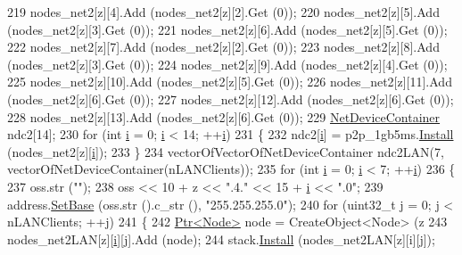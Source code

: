 \begin{DoxyCode}
219       nodes\_net2[z][4].Add (nodes\_net2[z][2].Get (0));
220       nodes\_net2[z][5].Add (nodes\_net2[z][3].Get (0));
221       nodes\_net2[z][6].Add (nodes\_net2[z][5].Get (0));
222       nodes\_net2[z][7].Add (nodes\_net2[z][2].Get (0));
223       nodes\_net2[z][8].Add (nodes\_net2[z][3].Get (0));
224       nodes\_net2[z][9].Add (nodes\_net2[z][4].Get (0));
225       nodes\_net2[z][10].Add (nodes\_net2[z][5].Get (0));
226       nodes\_net2[z][11].Add (nodes\_net2[z][6].Get (0));
227       nodes\_net2[z][12].Add (nodes\_net2[z][6].Get (0));
228       nodes\_net2[z][13].Add (nodes\_net2[z][6].Get (0));
229       \hyperlink{classns3_1_1NetDeviceContainer}{NetDeviceContainer} ndc2[14];
230       \textcolor{keywordflow}{for} (\textcolor{keywordtype}{int} \hyperlink{bernuolliDistribution_8m_a6f6ccfcf58b31cb6412107d9d5281426}{i} = 0; \hyperlink{bernuolliDistribution_8m_a6f6ccfcf58b31cb6412107d9d5281426}{i} < 14; ++\hyperlink{bernuolliDistribution_8m_a6f6ccfcf58b31cb6412107d9d5281426}{i})
231         \{
232           ndc2[\hyperlink{bernuolliDistribution_8m_a6f6ccfcf58b31cb6412107d9d5281426}{i}] = p2p\_1gb5ms.\hyperlink{classns3_1_1PointToPointHelper_ab9162fea3e88722666fed1106df1f9ec}{Install} (nodes\_net2[z][\hyperlink{bernuolliDistribution_8m_a6f6ccfcf58b31cb6412107d9d5281426}{i}]);
233         \}
234       vectorOfVectorOfNetDeviceContainer ndc2LAN(7, vectorOfNetDeviceContainer(nLANClients));
235       \textcolor{keywordflow}{for} (\textcolor{keywordtype}{int} \hyperlink{bernuolliDistribution_8m_a6f6ccfcf58b31cb6412107d9d5281426}{i} = 0; \hyperlink{bernuolliDistribution_8m_a6f6ccfcf58b31cb6412107d9d5281426}{i} < 7; ++\hyperlink{bernuolliDistribution_8m_a6f6ccfcf58b31cb6412107d9d5281426}{i})
236         \{
237           oss.str (\textcolor{stringliteral}{""});
238           oss << 10 + z << \textcolor{stringliteral}{".4."} << 15 + \hyperlink{bernuolliDistribution_8m_a6f6ccfcf58b31cb6412107d9d5281426}{i} << \textcolor{stringliteral}{".0"};
239           address.\hyperlink{classns3_1_1Ipv4AddressHelper_acf7b16dd25bac67e00f5e25f90a9a035}{SetBase} (oss.str ().c\_str (), \textcolor{stringliteral}{"255.255.255.0"});
240           \textcolor{keywordflow}{for} (uint32\_t j = 0; j < nLANClients; ++j)
241             \{
242               \hyperlink{classns3_1_1Ptr}{Ptr<Node>} node = CreateObject<Node> (z %
243               nodes\_net2LAN[z][\hyperlink{bernuolliDistribution_8m_a6f6ccfcf58b31cb6412107d9d5281426}{i}][j].Add (node);
244               stack.\hyperlink{classns3_1_1InternetStackHelper_a6645b412f31283d2d9bc3d8a95cebbc0}{Install} (nodes\_net2LAN[z][i][j]);

\end{DoxyCode}
